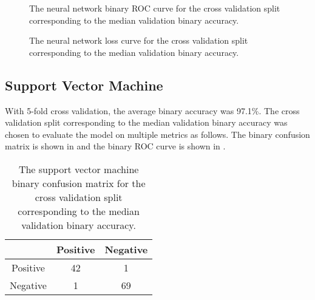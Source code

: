 \documentclass[twocolumn]{article}
\begin{document}
\begin{figure}
\begin{center}
\end{center}
\caption{The neural network binary ROC curve for the cross validation split
  corresponding to the median validation binary accuracy.}
\label{fig:NeuralNetworkROC}
\end{figure}

\begin{figure}
\begin{center}
\end{center}
\caption{The neural network loss curve for the cross validation split
  corresponding to the median validation binary accuracy.}
\label{fig:NeuralNetworkLoss}
\end{figure}

\subsection{Support Vector Machine}

With 5-fold cross validation, the average binary accuracy was 97.1\%. The cross
validation split corresponding to the median validation binary accuracy was
chosen to evaluate the model on multiple metrics as follows. The binary
confusion matrix is shown in  and
the binary ROC curve is shown in .

\begin{table}
\begin{center}
\begin{tabular}{ccc}
\toprule
& Positive & Negative \\
\midrule
Positive & 42 & 1 \\
Negative & 1 & 69 \\
\bottomrule
\end{tabular}
\end{center}
\caption{The support vector machine binary confusion matrix for the cross
  validation split corresponding to the median validation binary accuracy.}
\label{tab:SupportVectorMachineConfusionMatrix}
\end{table}
\end{document}
